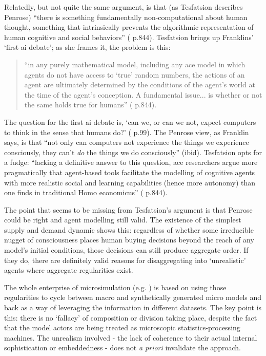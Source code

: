 Relatedly, but not quite the same argument, is that (as Tesfatsion describes Penrose) ``there is something fundamentally non-computational about human thought, something that intrinsically prevents the algorithmic representation of human cognitive and social behaviors'' (\citealt{tesfatsion_agent-based_2006} p.844). Tesfatsion brings up Franklins' `first \gls{ai} debate'; as she frames it, the problem is this: 

\begin{quote}
``in any purely mathematical model, including any \gls{ace} model in which agents do not have access to `true' random numbers, the actions of an agent are ultimately determined by the conditions of the agent's world at the time of the agent's conception. A fundamental issue... is whether or not the same holds true for humans'' (\citealt{tesfatsion_agent-based_2006} p.844). 
\end{quote}

The question for the first \gls{ai} debate is, `can we, or can we not, expect computers to think in the sense that humans do?' (\citealt{franklin_artificial_1997} p.99). The Penrose view, as Franklin says, is that ``not only can computers not experience the things we experience consciously, they can't \emph{do} the things we do consciously'' (ibid). Tesfatsion opts for a fudge: ``lacking a definitive answer to this question, \gls{ace} researchers argue more pragmatically that agent-based tools facilitate the modelling of cognitive agents with more realistic social and learning capabilities (hence more autonomy) than one finds in traditional Homo economicus'' (\citealt{tesfatsion_agent-based_2006} p.844).

The point that seems to be missing from Tesfatsion's argument is that Penrose could be right and agent modelling still valid. The existence of the simplest supply and demand dynamic shows this: regardless of whether some irreducible nugget of consciousness places human buying decisions beyond the reach of any model's initial conditions, those decisions can still produce aggregate order. If they do, there are definitely valid reasons for disaggregating into `unrealistic' agents where aggregate regularities exist. 

The whole enterprise of microsimulation (e.g. \citealt{ballas_modelling_2001}) is based on using those regularities to cycle between macro and synthetically generated micro models and back as a way of leveraging the information in different datasets. The key point is this: there is no `fallacy' of composition or division taking place, despite the fact that the model actors are being treated as microscopic statistics-processing machines. The unrealism involved  - the lack of coherence to their actual internal sophistication or embeddedness - does not \emph{a priori} invalidate the approach.

